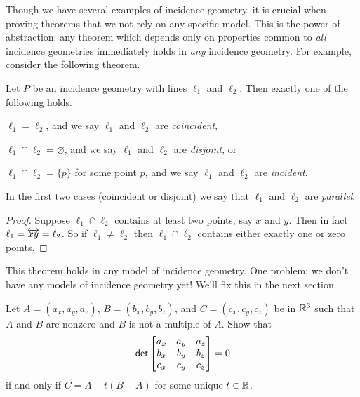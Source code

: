 Though we have several examples of incidence geometry, it is crucial when proving theorems that we not rely on any specific model. This is the power of abstraction: any theorem which depends only on properties common to \emph{all} incidence geometries immediately holds in \emph{any} incidence geometry. For example, consider the following theorem.

\begin{prop}
Let $P$ be an incidence geometry with lines $\ell_1$ and $\ell_2$. Then exactly one of the following holds.
\begin{proplist}
\item $\ell_1 = \ell_2$, and we say $\ell_1$ and $\ell_2$ are \emph{coincident},
\item $\ell_1 \cap \ell_2 = \varnothing$, and we say $\ell_1$ and $\ell_2$ are \emph{disjoint}, or
\item $\ell_1 \cap \ell_2 = \{p\}$ for some point $p$, and we say $\ell_1$ and $\ell_2$ are \emph{incident}.
\end{proplist}
In the first two cases (coincident or disjoint) we say that $\ell_1$ and $\ell_2$ are \emph{parallel}.
\end{prop}

\begin{proof}
Suppose $\ell_1 \cap \ell_2$ contains at least two points, say $x$ and $y$. Then in fact $\ell_1 = \overleftrightarrow{xy} = \ell_2$. So if $\ell_1 \neq \ell_2$ then $\ell_1 \cap \ell_2$ contains either exactly one or zero points.
\end{proof}

This theorem holds in any model of incidence geometry. One problem: we don't have any models of incidence geometry yet! We'll fix this in the next section.



\Exercises%

\begin{exercise}
Let $A = (a_x, a_y, a_z)$, $B = (b_x, b_y, b_z)$, and $C = (c_x, c_y, c_z)$ be in $\mathbb{R}^3$ such that $A$ and $B$ are nonzero and $B$ is not a multiple of $A$. Show that \[ \mathsf{det} \begin{bmatrix} a_x & a_y & a_z \\ b_x & b_y & b_z \\ c_x & c_y & c_z \end{bmatrix} = 0 \] if and only if $C = A + t(B - A)$ for some unique $t \in \mathbb{R}$.
\end{exercise}

